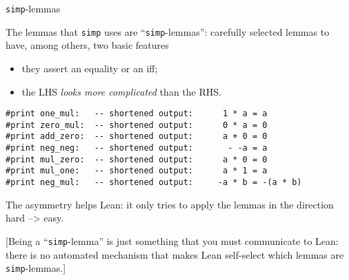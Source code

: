 \documentclass{beamer}
\begin{document}
\begin{frame}[fragile]{{\texttt{simp}}-lemmas}

The lemmas that {\verb`simp`} uses are ``{\verb`simp`}-lemmas'': carefully selected lemmas to have, among others, two basic features
\begin{itemize}
\item
  they assert an equality or an iff;
\item
  the LHS {\emph{looks more complicated}} than the RHS.
\end{itemize}

\begin{verbatim}
#print one_mul:   -- shortened output:      1 * a = a
#print zero_mul:  -- shortened output:      0 * a = 0
#print add_zero:  -- shortened output:      a + 0 = 0
#print neg_neg:   -- shortened output:       - -a = a
#print mul_zero:  -- shortened output:      a * 0 = 0
#print mul_one:   -- shortened output:      a * 1 = a
#print neg_mul:   -- shortened output:     -a * b = -(a * b)
\end{verbatim}

The asymmetry helps Lean: it only tries to apply the lemmas in the direction hard --> easy.

[Being a ``{\verb`simp`}-lemma'' is just something that you must communicate to Lean: there is no automated mechanism that makes Lean self-select which lemmas are {\verb`simp`}-lemmas.]
\end{frame}
\end{document}
